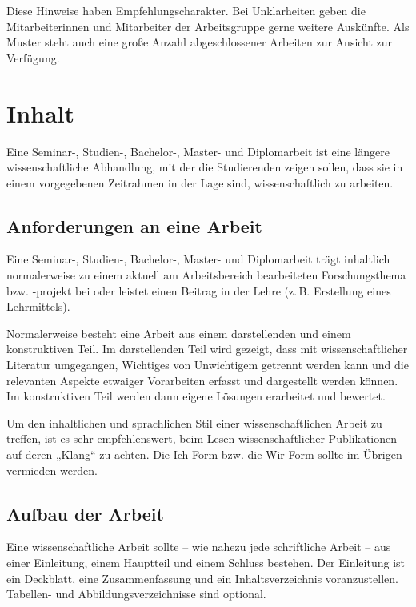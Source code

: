 \documentclass[
    fontsize=12pt,
    headings=small,
    parskip=half,           %
    bibliography=totoc,
    numbers=noenddot,       %
    open=any,               %
    ]{scrreprt}
\begin{document}
Diese Hinweise haben Empfehlungscharakter. Bei Unklarheiten geben die Mitarbeiterinnen und Mitarbeiter der Arbeitsgruppe gerne weitere Auskünfte. Als Muster steht auch eine große Anzahl abgeschlossener Arbeiten zur Ansicht zur Verfügung.

\chapter{Inhalt}
\label{sec.inhalt}

Eine Seminar-, Studien-, Bachelor-, Master- und Diplomarbeit ist eine längere wissenschaftliche Abhandlung, mit der die Studierenden zeigen sollen, dass sie in einem vorgegebenen Zeitrahmen in der Lage sind, wissenschaftlich zu arbeiten.

\section{Anforderungen an eine Arbeit}
\label{sec.anforderungen}

Eine Seminar-, Studien-, Bachelor-, Master- und Diplomarbeit trägt inhaltlich normalerweise zu einem aktuell am Arbeitsbereich bearbeiteten Forschungsthema bzw. -projekt bei oder leistet einen Beitrag in der Lehre (z.\,B. Erstellung eines Lehrmittels).

Normalerweise besteht eine Arbeit aus einem darstellenden und einem konstruktiven Teil. Im darstellenden Teil wird gezeigt, dass mit wissenschaftlicher Literatur umgegangen, Wichtiges von Unwichtigem getrennt werden kann und die relevanten Aspekte etwaiger Vorarbeiten erfasst und dargestellt werden können. Im konstruktiven Teil werden dann eigene Lösungen erarbeitet und bewertet.

Um den inhaltlichen und sprachlichen Stil einer wissenschaftlichen Arbeit zu treffen, ist es sehr empfehlenswert, beim Lesen wissenschaftlicher Publikationen auf deren „Klang“ \cite{Tolk2003} zu achten. Die Ich-Form bzw. die Wir-Form sollte im Übrigen vermieden werden.

\section{Aufbau der Arbeit}
\label{sec.aufbau}

Eine wissenschaftliche Arbeit sollte -- wie nahezu jede schriftliche Arbeit -- aus einer Einleitung, einem Hauptteil und einem Schluss bestehen. Der Einleitung ist ein Deckblatt, eine Zusammenfassung und ein Inhaltsverzeichnis voranzustellen. Tabellen- und Abbildungsverzeichnisse sind optional.
\end{document}
